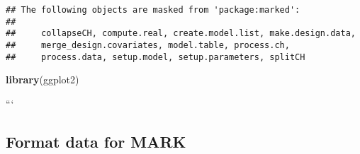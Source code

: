 \documentclass[]{article}
\newenvironment{Shaded}{\begin{snugshade}}{\end{snugshade}}
\newcommand{\KeywordTok}[1]{\textcolor[rgb]{0.13,0.29,0.53}{\textbf{#1}}}
\newcommand{\DataTypeTok}[1]{\textcolor[rgb]{0.13,0.29,0.53}{#1}}
\newcommand{\StringTok}[1]{\textcolor[rgb]{0.31,0.60,0.02}{#1}}
\newcommand{\OperatorTok}[1]{\textcolor[rgb]{0.81,0.36,0.00}{\textbf{#1}}}
\newcommand{\NormalTok}[1]{#1}
\begin{document}
\begin{verbatim}
## The following objects are masked from 'package:marked':
## 
##     collapseCH, compute.real, create.model.list, make.design.data,
##     merge_design.covariates, model.table, process.ch,
##     process.data, setup.model, setup.parameters, splitCH
\end{verbatim}

\begin{Shaded}
\begin{Highlighting}[]
\KeywordTok{library}\NormalTok{(ggplot2)}
\end{Highlighting}
\end{Shaded}

```

\begin{Shaded}
\end{Shaded}

\subsection{Format data for MARK}\label{format-data-for-mark}
\end{document}

